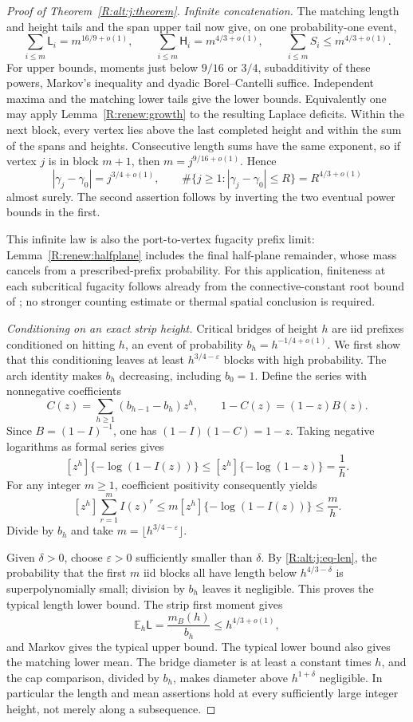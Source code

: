 \begin{proof}[Proof of Theorem~\ref{R:alt:j:theorem}]
\emph{Infinite concatenation.}
The matching length and height tails and the span upper tail now give,
on one probability-one event,
\[
 \sum_{i\le m}\mathsf L_i=m^{16/9+o(1)},\qquad
 \sum_{i\le m}\mathsf H_i=m^{4/3+o(1)},\qquad
 \sum_{i\le m}S_i\le m^{4/3+o(1)}.
\]
For upper bounds, moments just below $9/16$ or $3/4$, subadditivity of
these powers, Markov's inequality and dyadic Borel--Cantelli suffice.
Independent maxima and the matching lower tails give the lower bounds.
Equivalently one may apply Lemma~\ref{R:renew:growth} to the resulting
Laplace deficits. Within the next block, every vertex lies above the
last completed height and within the sum of the spans and heights.
Consecutive length sums have the same exponent, so if vertex $j$ is
in block $m+1$, then $m=j^{9/16+o(1)}$. Hence
\[
 |\gamma_j-\gamma_0|=j^{3/4+o(1)},\qquad
 \#\{j\ge1:|\gamma_j-\gamma_0|\le R\}=R^{4/3+o(1)}
\]
almost surely. The second assertion follows by inverting the two
eventual power bounds in the first.

This infinite law is also the port-to-vertex fugacity prefix limit:
Lemma~\ref{R:renew:halfplane} includes the final half-plane remainder,
whose mass cancels from a prescribed-prefix probability. For this
application, finiteness at each subcritical fugacity follows already
from the connective-constant root bound of \cite{DCS2012}; no stronger
counting estimate or thermal spatial conclusion is required.

\emph{Conditioning on an exact strip height.}
Critical bridges of height $h$ are iid prefixes conditioned on hitting
$h$, an event of probability $b_h=h^{-1/4+o(1)}$. We first show that this
conditioning leaves at least $h^{3/4-\varepsilon}$ blocks with high
probability. The arch identity makes $b_h$ decreasing, including $b_0=1$.
Define the series with nonnegative coefficients
\[
 C(z)=\sum_{h\ge1}(b_{h-1}-b_h)z^h,\qquad
 1-C(z)=(1-z)B(z).
\]
Since $B=(1-I)^{-1}$, one has
$(1-I)(1-C)=1-z$. Taking negative logarithms as formal series gives
\[
 [z^h]\{-\log(1-I(z))\}\le [z^h]\{-\log(1-z)\}=\frac1h.
\]
For any integer $m\ge1$, coefficient positivity consequently yields
\[
 [z^h]\sum_{r=1}^{m}I(z)^r
 \le m[z^h]\{-\log(1-I(z))\}\le\frac mh.
\]
Divide by $b_h$ and take $m=\lfloor h^{3/4-\varepsilon}\rfloor$.

Given $\delta>0$, choose $\varepsilon>0$ sufficiently smaller than
$\delta$. By \eqref{R:alt:j:eq-len}, the probability that the first $m$
iid blocks all have length below $h^{4/3-\delta}$ is superpolynomially
small; division by $b_h$ leaves it negligible. This proves the typical
length lower bound. The strip first moment gives
\[
 \mathbb E_h\mathsf L=\frac{m_B(h)}{b_h}\le h^{4/3+o(1)},
\]
and Markov gives the typical upper bound. The typical lower bound also
gives the matching lower mean. The bridge diameter is at least a constant
times $h$, and the cap comparison, divided by $b_h$, makes diameter above
$h^{1+\delta}$ negligible. In particular the length and mean assertions
hold at every sufficiently large integer height, not merely along a
subsequence.


\end{proof}
